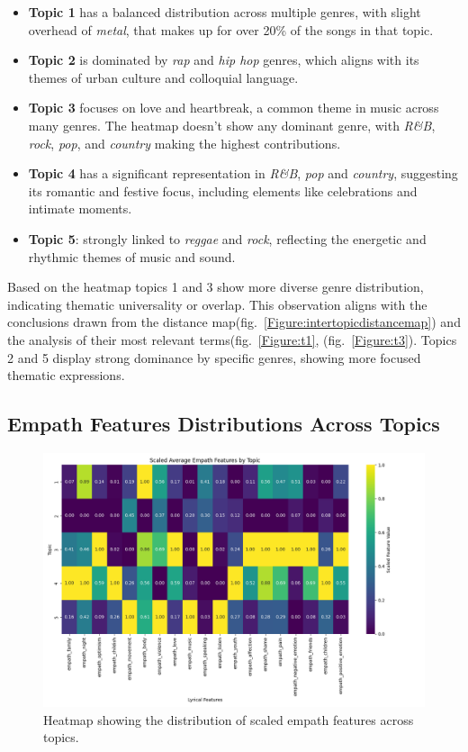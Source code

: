 \begin{itemize}
  \item \textbf{Topic 1} has a balanced distribution across multiple genres,
    with slight overhead of \textit{metal}, that makes up for over 20\% of the
    songs in that topic.
  \item \textbf{Topic 2} is dominated by \textit{rap} and \textit{hip hop} genres, which
    aligns with its themes of urban culture and colloquial language.
  \item \textbf{Topic 3} focuses on love and heartbreak, a common theme in
    music across many genres. The heatmap doesn't show any dominant genre, with
    \textit{R\&B}, \textit{rock}, \textit{pop}, and \textit{country} making the
    highest contributions.
  \item \textbf{Topic 4} has a significant representation in \textit{R\&B},
    \textit{pop} and \textit{country}, suggesting its romantic and festive
    focus, including elements like celebrations and intimate moments.
  \item \textbf{Topic 5}: strongly linked to \textit{reggae} and
    \textit{rock}, reflecting the energetic and rhythmic themes of music and
    sound.
\end{itemize}

Based on the heatmap topics 1 and 3 show more diverse genre distribution,
indicating thematic universality or overlap. This observation aligns with the
conclusions drawn from the  distance
map(fig.~\ref{Figure:intertopicdistancemap}) and the analysis of their most
relevant terms(fig.~\ref{Figure:t1}, (fig.~\ref{Figure:t3}). Topics 2 and
5 display strong dominance by specific genres, showing more focused thematic
expressions.


\subsection{Empath Features Distributions Across Topics}

\begin{center}
\begin{figure}[H]
  \centering
  \includegraphics[width=5in]{img/lda_empath_features.png}
  \caption{Heatmap showing the distribution of scaled empath features across topics.}
  \label{Figure:fig_eh}
\end{figure}
\end{center}


